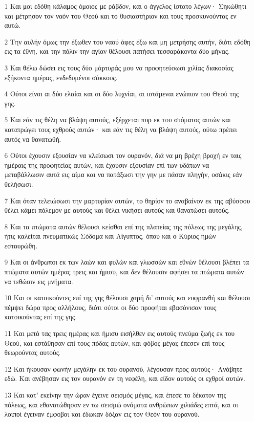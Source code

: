 \par 1 Και μοι εδόθη κάλαμος όμοιος με ράβδον, και ο άγγελος ίστατο λέγων· Σηκώθητι και μέτρησον τον ναόν του Θεού και το θυσιαστήριον και τους προσκυνούντας εν αυτώ.
\par 2 Την αυλήν όμως την έξωθεν του ναού άφες έξω και μη μετρήσης αυτήν, διότι εδόθη εις τα έθνη, και την πόλιν την αγίαν θέλουσι πατήσει τεσσαράκοντα δύο μήνας.
\par 3 Και θέλω δώσει εις τους δύο μάρτυράς μου να προφητεύσωσι χιλίας διακοσίας εξήκοντα ημέρας, ενδεδυμένοι σάκκους.
\par 4 Ούτοι είναι αι δύο ελαίαι και αι δύο λυχνίαι, αι ιστάμεναι ενώπιον του Θεού της γης.
\par 5 Και εάν τις θέλη να βλάψη αυτούς, εξέρχεται πυρ εκ του στόματος αυτών και κατατρώγει τους εχθρούς αυτών· και εάν τις θέλη να βλάψη αυτούς, ούτω πρέπει αυτός να θανατωθή.
\par 6 Ούτοι έχουσιν εξουσίαν να κλείσωσι τον ουρανόν, διά να μη βρέχη βροχή εν ταις ημέραις της προφητείας αυτών, και έχουσιν εξουσίαν επί των υδάτων να μεταβάλλωσιν αυτά εις αίμα και να πατάξωσι την γην με πάσαν πληγήν, οσάκις εάν θελήσωσι.
\par 7 Και όταν τελειώσωσι την μαρτυρίαν αυτών, το θηρίον το αναβαίνον εκ της αβύσσου θέλει κάμει πόλεμον με αυτούς και θέλει νικήσει αυτούς και θανατώσει αυτούς.
\par 8 Και τα πτώματα αυτών θέλουσι κείσθαι επί της πλατείας της πόλεως της μεγάλης, ήτις καλείται πνευματικώς Σόδομα και Αίγυπτος, όπου και ο Κύριος ημών εσταυρώθη.
\par 9 Και οι άνθρωποι εκ των λαών και φυλών και γλωσσών και εθνών θέλουσι βλέπει τα πτώματα αυτών ημέρας τρεις και ήμισυ, και δεν θέλουσιν αφήσει τα πτώματα αυτών να τεθώσιν εις μνήματα.
\par 10 Και οι κατοικούντες επί της γης θέλουσι χαρή δι' αυτούς και ευφρανθή και θέλουσι πέμψει δώρα προς αλλήλους, διότι ούτοι οι δύο προφήται εβασάνισαν τους κατοικούντας επί της γης.
\par 11 Και μετά τας τρεις ημέρας και ήμισυ εισήλθεν εις αυτούς πνεύμα ζωής εκ του Θεού, και εστάθησαν επί τους πόδας αυτών, και φόβος μέγας έπεσεν επί τους θεωρούντας αυτούς.
\par 12 Και ήκουσαν φωνήν μεγάλην εκ του ουρανού, λέγουσαν προς αυτούς· Ανάβητε εδώ. Και ανέβησαν εις τον ουρανόν εν τη νεφέλη, και είδον αυτούς οι εχθροί αυτών.
\par 13 Και κατ' εκείνην την ώραν έγεινε σεισμός μέγας, και έπεσε το δέκατον της πόλεως, και εθανατώθησαν εν τω σεισμώ ονόματα ανθρώπων χιλιάδες επτά, και οι λοιποί έγειναν έμφοβοι και έδωκαν δόξαν εις τον Θεόν του ουρανού.
